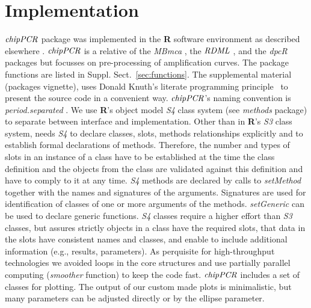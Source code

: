 \documentclass{bioinfo}
\begin{document}
\section{Implementation}
\begin{methods}
$\emph{chipPCR}$ package was implemented in the \textbf{R} software environment 
as described elsewhere \citep{RCT_2013,rodiger_rkward_2012}. $\emph{chipPCR}$ is 
a relative of the \emph{MBmca} \citep{roediger_RJ_2013}, the $\emph{RDML}$  
\citep{blagodatskikh_2014}, and the \emph{dpcR} \citep{pabinger_2014} packages but 
focusses on pre-processing of amplification curves. The package functions are 
listed in Suppl. Sect.~\ref{sec:functions}. The supplemental material 
(packages vignette), uses Donald Knuth's literate programming 
principle~\citep{Knuth1984} to present the source code in a convenient way. 
$\emph{chipPCR}$'s naming convention is \textit{period.separated} 
\citep{Baaaath_2012}. We use \textbf{R}'s object model \emph{S4} class system 
(see \emph{methods} package) to separate between interface and implementation. 
Other than in \textbf{R}'s \emph{S3} class system, needs \emph{S4} to declare 
classes, slots, methods relationships explicitly and to establish formal 
declarations of methods. Therefore, the number and types of slots in an instance 
of a class have to be established at the time the class definition and the 
objects from the class are validated against this definition and have to comply 
to it at any time. \emph{S4} methods are declared by calls to \textsl{setMethod} 
together with the names and signatures of the arguments. Signatures are used for 
identification of classes of one or more arguments of the methods. 
\textsl{setGeneric} can be used to declare generic functions. \emph{S4} classes 
require a higher effort than \emph{S3} classes, but assures strictly objects in 
a class have the required slots, that data in the slots have consistent names 
and classes, and enable to include additional information (e.g., results, 
parameters). As perquisite for high-throughput technologies we avoided loops in 
the core structures and use partially parallel computing (\textsl{smoother} 
function) to keep the code fast. $\emph{chipPCR}$ includes a set of classes for 
plotting. The output of our custom made plots is minimalistic, but many 
parameters can be adjusted directly or by the ellipse parameter.


\end{methods}
\end{document}
